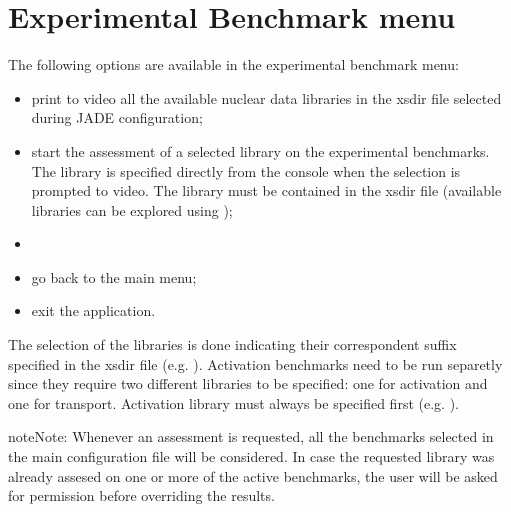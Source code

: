 \documentclass[letterpaper,10pt,english]{sphinxmanual}
\let\sphinxpxdimen\pdfpxdimen\else\newdimen\sphinxpxdimen
\begin{document}
\section{Experimental Benchmark menu}
\label{\detokenize{usage/menu:experimental-benchmark-menu}}\label{\detokenize{usage/menu:expmenu}}
\noindent\sphinxincludegraphics[width=400\sphinxpxdimen]{{expmenu}.png}

The following options are available in the experimental benchmark menu:
\begin{itemize}
\item {} 
 print to video all the available nuclear data libraries
in the xsdir file selected during JADE configuration;

\item {} 
 start the assessment of a selected library on the experimental benchmarks. The library is
specified directly from the console when the selection is prompted to
video. The library must be contained in the xsdir file (available libraries
can be explored using );

\item {} 
 

\item {} 
 go back to the main menu;

\item {} 
 exit the application.

\end{itemize}

The selection of the libraries is done indicating their correspondent suffix specified in the xsdir file
(e.g. ). Activation benchmarks need to be run separetly since they require two different libraries
to be specified: one for activation and one for transport. Activation library must always be specified
first (e.g. ).

\begin{sphinxadmonition}{note}{Note:}
Whenever an assessment is requested, all the benchmarks selected in the main configuration file will be considered.
In case the requested library was already assesed on one or more of the active benchmarks,
the user will be asked for permission before overriding the results.
\end{sphinxadmonition}
\end{document}
